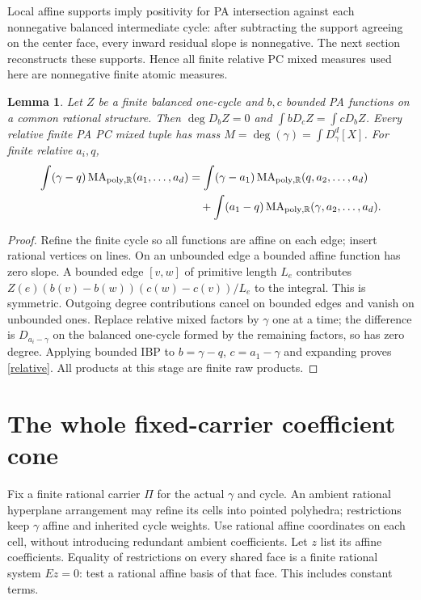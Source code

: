 \documentclass[11pt]{article}
\newtheorem{lemma}[theorem]{Lemma}
\newcommand{\R}{\mathbb R}
\newcommand{\MA}{\operatorname{MA}_{\mathrm{poly},\R}}
\begin{document}
Local affine supports imply positivity for PA intersection against
each nonnegative balanced intermediate cycle: after subtracting the
support agreeing on the center face, every inward residual slope is
nonnegative. The next section reconstructs these supports. Hence all
finite relative PC mixed measures used here are nonnegative finite
atomic measures.

\begin{lemma}\label{ibp}
Let $Z$ be a finite balanced one-cycle and $b,c$ bounded PA functions
on a common rational structure. Then $\deg D_b Z=0$ and
$\int bD_cZ=\int cD_bZ$. Every relative finite PA PC mixed tuple has
mass $M=\deg(\gamma)=\int D_\gamma^d[X]$. For finite relative $a_i,q$,
\begin{align}\label{relative}
 \int(\gamma-q)\MA(a_1,\ldots,a_d)
 &=\int(\gamma-a_1)\MA(q,a_2,\ldots,a_d)\notag\\
 &\quad+\int(a_1-q)\MA(\gamma,a_2,\ldots,a_d).
\end{align}
\end{lemma}
\begin{proof}
Refine the finite cycle so all functions are affine on each edge;
insert rational vertices on lines. On an unbounded edge a bounded
affine function has zero slope. A bounded edge $[v,w]$ of primitive
length $L_e$ contributes
$Z(e)(b(v)-b(w))(c(w)-c(v))/L_e$ to the integral. This is symmetric.
Outgoing degree contributions cancel on bounded edges and vanish on
unbounded ones. Replace relative mixed factors by $\gamma$ one at a
time; the difference is $D_{a_i-\gamma}$ on the balanced one-cycle
formed by the remaining factors, so has zero degree. Applying bounded
IBP to $b=\gamma-q$, $c=a_1-\gamma$ and expanding proves
\eqref{relative}. All products at this stage are finite raw products.
\end{proof}

\section{The whole fixed-carrier coefficient cone}
Fix a finite rational carrier $\Pi$ for the actual $\gamma$ and cycle.
An ambient rational hyperplane arrangement may refine its cells into
pointed polyhedra; restrictions keep $\gamma$ affine and inherited
cycle weights. Use rational affine coordinates on each cell, without
introducing redundant ambient coefficients. Let $z$ list its affine
coefficients. Equality of restrictions on every shared face is a
finite rational system $Ez=0$: test a rational affine basis of that
face. This includes constant terms.
\end{document}

